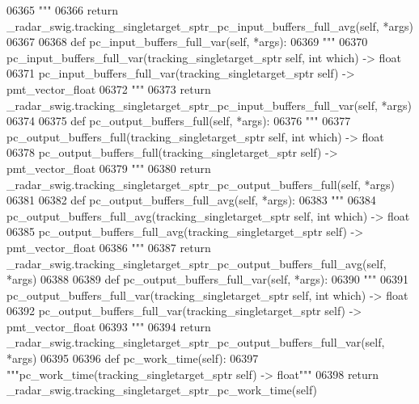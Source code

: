 \begin{DoxyCode}
{{{{{{{{{{{{{{{{{{{{{06365 \textcolor{stringliteral}{        """}
06366         \textcolor{keywordflow}{return} \_radar\_swig.tracking\_singletarget\_sptr\_pc\_input\_buffers\_full\_avg(self, *args)
06367 
06368     \textcolor{keyword}{def }pc_input_buffers_full_var(self, *args):
06369         \textcolor{stringliteral}{"""}
06370 \textcolor{stringliteral}{        pc\_input\_buffers\_full\_var(tracking\_singletarget\_sptr self, int which) -> float}
06371 \textcolor{stringliteral}{        pc\_input\_buffers\_full\_var(tracking\_singletarget\_sptr self) -> pmt\_vector\_float}
06372 \textcolor{stringliteral}{        """}
06373         \textcolor{keywordflow}{return} \_radar\_swig.tracking\_singletarget\_sptr\_pc\_input\_buffers\_full\_var(self, *args)
06374 
06375     \textcolor{keyword}{def }pc_output_buffers_full(self, *args):
06376         \textcolor{stringliteral}{"""}
06377 \textcolor{stringliteral}{        pc\_output\_buffers\_full(tracking\_singletarget\_sptr self, int which) -> float}
06378 \textcolor{stringliteral}{        pc\_output\_buffers\_full(tracking\_singletarget\_sptr self) -> pmt\_vector\_float}
06379 \textcolor{stringliteral}{        """}
06380         \textcolor{keywordflow}{return} \_radar\_swig.tracking\_singletarget\_sptr\_pc\_output\_buffers\_full(self, *args)
06381 
06382     \textcolor{keyword}{def }pc_output_buffers_full_avg(self, *args):
06383         \textcolor{stringliteral}{"""}
06384 \textcolor{stringliteral}{        pc\_output\_buffers\_full\_avg(tracking\_singletarget\_sptr self, int which) -> float}
06385 \textcolor{stringliteral}{        pc\_output\_buffers\_full\_avg(tracking\_singletarget\_sptr self) -> pmt\_vector\_float}
06386 \textcolor{stringliteral}{        """}
06387         \textcolor{keywordflow}{return} \_radar\_swig.tracking\_singletarget\_sptr\_pc\_output\_buffers\_full\_avg(self, *args)
06388 
06389     \textcolor{keyword}{def }pc_output_buffers_full_var(self, *args):
06390         \textcolor{stringliteral}{"""}
06391 \textcolor{stringliteral}{        pc\_output\_buffers\_full\_var(tracking\_singletarget\_sptr self, int which) -> float}
06392 \textcolor{stringliteral}{        pc\_output\_buffers\_full\_var(tracking\_singletarget\_sptr self) -> pmt\_vector\_float}
06393 \textcolor{stringliteral}{        """}
06394         \textcolor{keywordflow}{return} \_radar\_swig.tracking\_singletarget\_sptr\_pc\_output\_buffers\_full\_var(self, *args)
06395 
06396     \textcolor{keyword}{def }pc_work_time(self):
06397         \textcolor{stringliteral}{"""pc\_work\_time(tracking\_singletarget\_sptr self) -> float"""}
06398         \textcolor{keywordflow}{return} \_radar\_swig.tracking\_singletarget\_sptr\_pc\_work\_time(self)
}}}}}}}}}}}}}}}}}}}}}
\end{DoxyCode}
